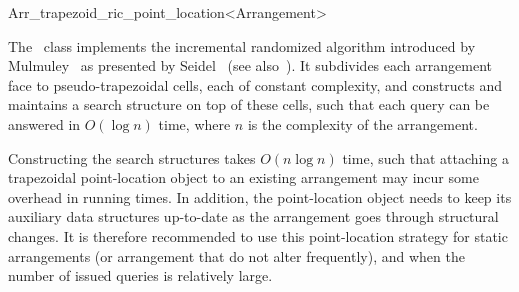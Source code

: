 
\ccRefPageBegin

\begin{ccRefClass}{Arr_trapezoid_ric_point_location<Arrangement>}
\label{arr_ref:trap_pl}

\ccDefinition
The \ccRefName\ class implements the incremental randomized algorithm
introduced by Mulmuley~\cite{m-fppa-90} as presented by
Seidel~\cite{s-sfira-91} (see also~\cite[Chapter~6]{bkos-cgaa-00}).
It subdivides each arrangement face to pseudo-trapezoidal cells, each
of constant complexity, and constructs and maintains a search
structure on top of these cells, such that each query can be answered
in $O(\log n)$ time, where $n$ is the complexity of the arrangement.

Constructing the search structures takes $O(n \log n)$ time, such that
attaching a trapezoidal point-location object to an existing arrangement
may incur some overhead in running times. In addition, the point-location
object needs to keep its auxiliary data structures up-to-date as the
arrangement goes through structural changes. It is therefore recommended
to use this point-location strategy for static arrangements (or arrangement
that do not alter frequently), and when the number of issued queries
is relatively large.


\ccIsModel
\\

\ccSeeAlso
\\
\\

\end{ccRefClass}

\ccRefPageEnd
